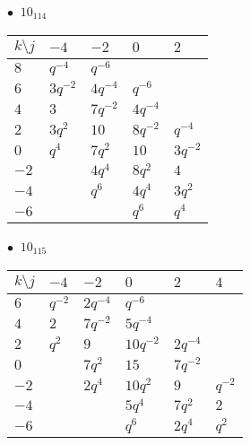 \begin{minipage}{\linewidth}
$\bullet\ $ $10_{114}$ \vspace{0.5em} \\
\begin{tabular}{l|llll}
$k \setminus j$ & $-4$ & $-2$ & $0$ & $2$ \\
\hline
$8$ & $q^{-4}$ & $q^{-6}$ &  &  \\
$6$ & $3q^{-2}$ & $4q^{-4}$ & $q^{-6}$ &  \\
$4$ & $3$ & $7q^{-2}$ & $4q^{-4}$ &  \\
$2$ & $3q^{2}$ & $10$ & $8q^{-2}$ & $q^{-4}$ \\
$0$ & $q^{4}$ & $7q^{2}$ & $10$ & $3q^{-2}$ \\
$-2$ &  & $4q^{4}$ & $8q^{2}$ & $4$ \\
$-4$ &  & $q^{6}$ & $4q^{4}$ & $3q^{2}$ \\
$-6$ &  &  & $q^{6}$ & $q^{4}$ \\
\end{tabular}
\vspace{2em}
\end{minipage}
%
\begin{minipage}{\linewidth}
$\bullet\ $ $10_{115}$ \vspace{0.5em} \\
\begin{tabular}{l|lllll}
$k \setminus j$ & $-4$ & $-2$ & $0$ & $2$ & $4$ \\
\hline
$6$ & $q^{-2}$ & $2q^{-4}$ & $q^{-6}$ &  &  \\
$4$ & $2$ & $7q^{-2}$ & $5q^{-4}$ &  &  \\
$2$ & $q^{2}$ & $9$ & $10q^{-2}$ & $2q^{-4}$ &  \\
$0$ &  & $7q^{2}$ & $15$ & $7q^{-2}$ &  \\
$-2$ &  & $2q^{4}$ & $10q^{2}$ & $9$ & $q^{-2}$ \\
$-4$ &  &  & $5q^{4}$ & $7q^{2}$ & $2$ \\
$-6$ &  &  & $q^{6}$ & $2q^{4}$ & $q^{2}$ \\
\end{tabular}
\vspace{2em}
\end{minipage}
%
